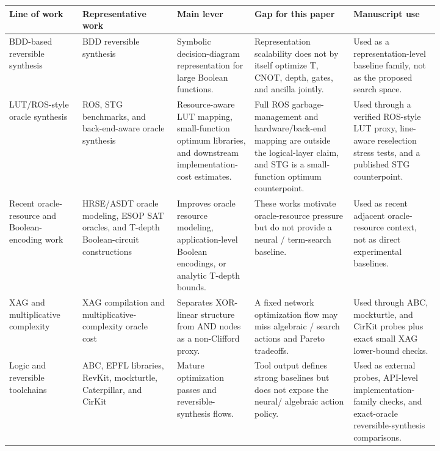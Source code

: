 \begin{tabularx}{\linewidth}{>{\raggedright\arraybackslash}p{0.17\linewidth}>{\raggedright\arraybackslash}p{0.22\linewidth}>{\raggedright\arraybackslash}X>{\raggedright\arraybackslash}p{0.23\linewidth}>{\raggedright\arraybackslash}p{0.20\linewidth}}
\toprule
Line of work & Representative work & Main lever & Gap for this paper & Manuscript use \\
\midrule
BDD-based reversible synthesis & BDD reversible synthesis~\cite{wille2009bdd} & Symbolic decision-diagram representation for large Boolean functions. & Representation scalability does not by itself optimize T, CNOT, depth, gates, and ancilla jointly. & Used as a representation-level baseline family, not as the proposed search space. \\
LUT/ROS-style oracle synthesis & ROS, STG benchmarks, and back-end-aware oracle synthesis~\cite{meuli2020ros,stgBenchmark,yu2025backend} & Resource-aware LUT mapping, small-function optimum libraries, and downstream implementation-cost estimates. & Full ROS garbage-management and hardware/back-end mapping are outside the logical-layer claim, and STG is a small-function optimum counterpoint. & Used through a verified ROS-style LUT proxy, line-aware reselection stress tests, and a published STG counterpoint. \\
Recent oracle-resource and Boolean-encoding work & HRSE/ASDT oracle modeling, ESOP SAT oracles, and T-depth Boolean-circuit constructions~\cite{li2026oracle,assaad2026esop,dutta2025tdepth} & Improves oracle resource modeling, application-level Boolean encodings, or analytic T-depth bounds. & These works motivate oracle-resource pressure but do not provide a neural \mcts{} \anf{}/\fprm{} term-search baseline. & Used as recent adjacent oracle-resource context, not as direct experimental baselines. \\
XAG and multiplicative complexity & XAG compilation and multiplicative-complexity oracle cost~\cite{meuli2019multiplicative,meuli2022xag} & Separates XOR-linear structure from AND nodes as a non-Clifford proxy. & A fixed network optimization flow may miss algebraic \fprm{}/\anf{} search actions and Pareto tradeoffs. & Used through ABC, mockturtle, and CirKit probes plus exact small XAG lower-bound checks. \\
Logic and reversible toolchains & ABC, EPFL libraries, RevKit, mockturtle, Caterpillar, and CirKit~\cite{brayton2010abc,soeken2018epfl,soeken2012revkit,revkit,mockturtle,caterpillar,cirkit} & Mature optimization passes and reversible-synthesis flows. & Tool output defines strong baselines but does not expose the neural/\mcts{} algebraic action policy. & Used as external probes, API-level implementation-family checks, and exact-oracle reversible-synthesis comparisons. \\

\end{tabularx}
